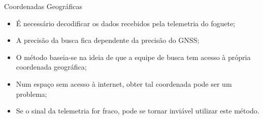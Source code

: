 \begin{frame}{Coordenadas Geográficas}
	\begin{itemize}[<+->]\addtolength{\itemsep}{0.5\baselineskip}
		\item É necessário decodificar os dados recebidos pela telemetria do foguete;
		\item A precisão da busca fica dependente da precisão do GNSS;
		\item O método baseia-se na ideia de que a equipe de busca tem acesso à própria coordenada geográfica;
		\item Num espaço sem acesso à internet, obter tal coordenada pode ser um problema;
		\item Se o sinal da telemetria for fraco, pode se tornar inviável utilizar este método.
	\end{itemize}
\end{frame}
